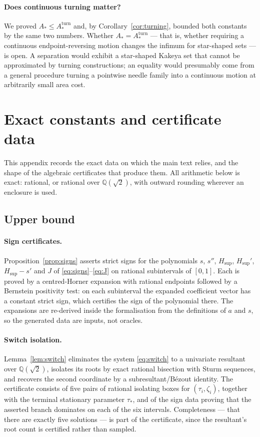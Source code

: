 \documentclass[11pt]{article}
\theoremstyle{plain}
\theoremstyle{definition}
\theoremstyle{remark}
\newcommand{\Q}{\mathbb{Q}}
\newcommand{\Astar}{A_{*}}
\newcommand{\Aturn}{A_{*}^{\mathrm{turn}}}
\newcommand{\Hsup}{H_{\mathrm{sup}}}
\begin{document}
\paragraph{Does continuous turning matter?} We proved $\Astar\le\Aturn$ and, by
Corollary~\ref{cor:turning}, bounded both constants by the same two numbers.
Whether $\Astar=\Aturn$ --- that is, whether requiring a continuous
endpoint-reversing motion changes the infimum for star-shaped sets --- is open. A
separation would exhibit a star-shaped Kakeya set that cannot be approximated by
turning constructions; an equality would presumably come from a general
procedure turning a pointwise needle family into a continuous motion at
arbitrarily small area cost.

\appendix

\section{Exact constants and certificate data}\label{app:constants}

This appendix records the exact data on which the main text relies, and the
shape of the algebraic certificates that produce them. All arithmetic below is
exact: rational, or rational over $\Q(\sqrt2)$, with outward rounding wherever
an enclosure is used.

\subsection{Upper bound}

\paragraph{Sign certificates.} Proposition~\ref{prop:signs} asserts strict signs
for the polynomials $s$, $s''$, $\Hsup$, $\Hsup'$, $\Hsup-s'$ and $J$ of
\eqref{eq:signs}--\eqref{eq:J} on rational subintervals of $[0,1]$. Each is
proved by a centred-Horner expansion with rational endpoints followed by a
Bernstein positivity test: on each subinterval the expanded coefficient vector
has a constant strict sign, which certifies the sign of the polynomial there.
The expansions are re-derived inside the formalisation from the definitions of
$a$ and $s$, so the generated data are inputs, not oracles.

\paragraph{Switch isolation.} Lemma~\ref{lem:switch} eliminates the system
\eqref{eq:switch} to a univariate resultant over $\Q(\sqrt2)$, isolates its
roots by exact rational bisection with Sturm sequences, and recovers the second
coordinate by a subresultant/B\'ezout identity. The certificate consists of five
pairs of rational isolating boxes for $(\tau_{i},\zeta_{i})$, together with the
terminal stationary parameter $\tau_{*}$, and of the sign data proving that the
asserted branch dominates on each of the six intervals. Completeness --- that
there are exactly five solutions --- is part of the certificate, since the
resultant's root count is certified rather than sampled.
\end{document}
